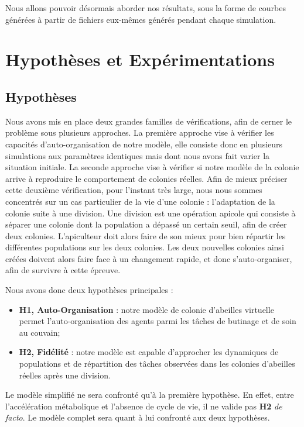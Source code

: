 		Nous allons pouvoir désormais aborder nos résultats, sous la forme de courbes générées à partir de fichiers eux-mêmes générés pendant chaque simulation. 
		
		
		
	\section{Hypothèses et Expérimentations}
		\subsection{Hypothèses}
			Nous avons mis en place deux grandes familles de vérifications, afin de cerner le problème sous plusieurs approches. La première approche vise à vérifier les capacités d'auto-organisation de notre modèle, elle consiste donc en plusieurs simulations aux paramètres identiques mais dont nous avons fait varier la situation initiale. La seconde approche vise à vérifier si notre modèle de la colonie arrive à reproduire le comportement de colonies réelles. Afin de mieux préciser cette deuxième vérification, pour l'instant très large, nous nous sommes concentrés sur un cas particulier de la vie d'une colonie : l'adaptation de la colonie suite à une division. Une division est une opération apicole qui consiste à séparer une colonie dont la population a dépassé un certain seuil, afin de créer deux colonies. L'apiculteur doit alors faire de son mieux pour bien répartir les différentes populations sur les deux colonies. Les deux nouvelles colonies ainsi créées doivent alors faire face à un changement rapide, et donc s'auto-organiser, afin de survivre à cette épreuve.
			
			Nous avons donc deux hypothèses principales :
			\begin{itemize}
				\item \textbf{H1, Auto-Organisation} : notre modèle de colonie d'abeilles virtuelle permet l'auto-organisation des agents parmi les tâches de butinage et de soin au couvain;
				\item \textbf{H2, Fidélité} : notre modèle est capable d'approcher les dynamiques de populations et de répartition des tâches observées dans les colonies d'abeilles réelles après une division.
			\end{itemize}
			
		Le modèle simplifié ne sera confronté qu'à la première hypothèse. En effet, entre l'accélération métabolique et l'absence de cycle de vie, il ne valide pas \textbf{H2} \textit{de facto}. Le modèle complet sera quant à lui confronté aux deux hypothèses.
			
